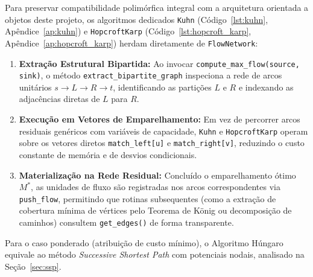 Para preservar compatibilidade polimórfica integral com a arquitetura orientada a objetos deste projeto, os algoritmos dedicados \lstinline{Kuhn} (Código~\ref{lst:kuhn}, Apêndice~\ref{ap:kuhn}) e \lstinline{HopcroftKarp} (Código~\ref{lst:hopcroft_karp}, Apêndice~\ref{ap:hopcroft_karp}) herdam diretamente de \lstinline{FlowNetwork}:
\begin{enumerate}
    \item \textbf{Extração Estrutural Bipartida:} Ao invocar \lstinline{compute_max_flow(source, sink)}, o método \lstinline{extract_bipartite_graph} inspeciona a rede de arcos unitários $s \to L \to R \to t$, identificando as partições $L$ e $R$ e indexando as adjacências diretas de $L$ para $R$.
    \item \textbf{Execução em Vetores de Emparelhamento:} Em vez de percorrer arcos residuais genéricos com variáveis de capacidade, \lstinline{Kuhn} e \lstinline{HopcroftKarp} operam sobre os vetores diretos \lstinline{match_left[u]} e \lstinline{match_right[v]}, reduzindo o custo constante de memória e de desvios condicionais.
    \item \textbf{Materialização na Rede Residual:} Concluído o emparelhamento ótimo $M^*$, as unidades de fluxo são registradas nos arcos correspondentes via \lstinline{push_flow}, permitindo que rotinas subsequentes (como a extração de cobertura mínima de vértices pelo Teorema de König ou decomposição de caminhos) consultem \lstinline{get_edges()} de forma transparente.
\end{enumerate}

Para o caso ponderado (atribuição de custo mínimo), o Algoritmo Húngaro~\cite{kuhn1955hungarian} equivale ao método \textit{Successive Shortest Path} com potenciais nodais, analisado na Seção~\ref{sec:ssp}.


